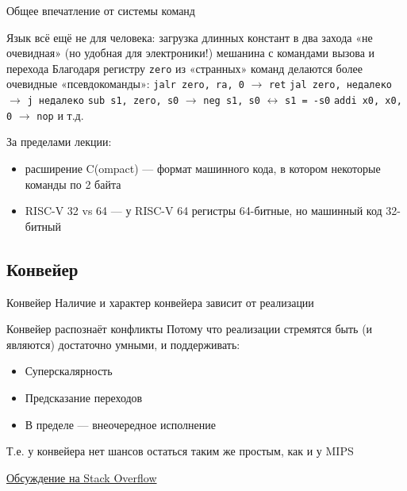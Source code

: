 \documentclass[xetex,aspectratio=43]{beamer}
\begin{document}
\begin{frame}{Общее впечатление от системы команд}
    \begin{outline}[itemize]
        \1 Язык всё ещё не для человека:
            \2 загрузка длинных констант в два захода
            \2 «не очевидная» (но удобная для электроники!) мешанина с командами вызова и перехода
        \1 Благодаря регистру \texttt{zero} из «странных» команд делаются более очевидные «псевдокоманды»:
            \2 \texttt{jalr zero, ra, 0} $\rightarrow$ \texttt{ret}
            \2 \texttt{jal zero, недалеко} $\rightarrow$ \texttt{j недалеко}
            \2 \texttt{sub s1, zero, s0} $\rightarrow$ \texttt{neg s1, s0} $\leftrightarrow$ \texttt{s1 = -s0}
            \2 \texttt{addi x0, x0, 0} $\rightarrow$ \texttt{nop}
            \2 и т.д.
    \end{outline}
    \pause
    \alert{За пределами лекции:}
    \begin{itemize}
        \item расширение C(ompact) --- формат машинного кода, в котором некоторые команды по 2 байта
        \item RISC-V 32 vs 64 --- у RISC-V 64 регистры 64-битные, но машинный код 32-битный
    \end{itemize}

\end{frame}

\subsection{Конвейер}

\begin{frame}{Конвейер}
    Наличие и характер конвейера зависит от реализации
    \pause
    \begin{block}{Конвейер распознаёт конфликты}
        Потому что реализации стремятся быть (и являются) достаточно умными, и поддерживать:
        \begin{itemize}
            \tightlist
            \item Суперскалярность
            \item Предсказание переходов
            \item В пределе --- внеочередное исполнение
        \end{itemize}
        Т.е. у конвейера нет шансов остаться таким же простым, как и у MIPS
    \end{block}
    \pause
    \href{https://stackoverflow.com/a/54725021}{Обсуждение на Stack Overflow}
\end{frame}
\end{document}
